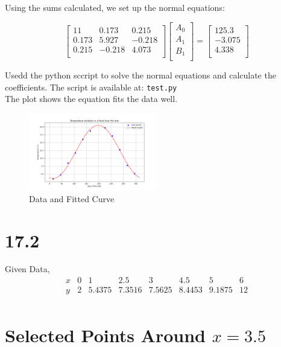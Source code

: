 \documentclass[12pt]{article}
\begin{document}
Using the sums calculated, we set up the normal equations:

\[
\begin{bmatrix}
11 & 0.173 & 0.215 \\
0.173 & 5.927 & -0.218 \\
0.215 & -0.218 & 4.073 \\
\end{bmatrix} \begin{bmatrix}
A_0 \\
A_1 \\
B_1 \\
\end{bmatrix} = \begin{bmatrix}
125.3 \\
-3.075 \\
4.338 \\
\end{bmatrix}
\]

Usedd the python sccript to solve the normal equations and calculate the coefficients. The script is available at: \texttt{test.py}\\
The plot shows the equation fits the data well. 

\begin{figure}[h]
    \centering
    \includegraphics[width=0.5\textwidth]{../temperature_fit.png}
    \caption{Data and Fitted Curve}
\end{figure}
\section{17.2}
Given Data,
\[
\begin{array}{c|ccccccc}
x & 0 & 1 & 2.5 & 3 & 4.5 & 5 & 6 \\
\hline
y & 2 & 5.4375 & 7.3516 & 7.5625 & 8.4453 & 9.1875 & 12 \\
\end{array}
\]

\section*{Selected Points Around \( x = 3.5 \)}
\end{document}
